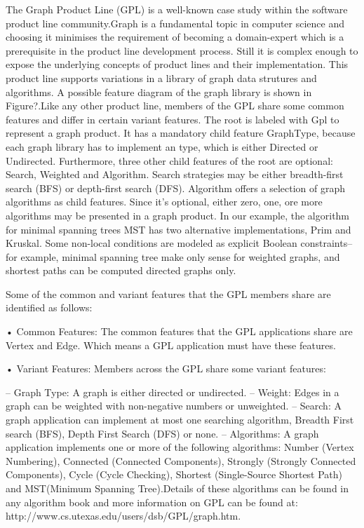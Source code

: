 

The Graph Product Line (GPL) is a well-known case study within the software product line community.Graph is a
fundamental topic in computer science and choosing it minimises the requirement
of becoming a domain-expert which is a prerequisite in the product line development process. Still it is complex
enough to expose the underlying concepts of product lines and their implementation. This product line
 supports variations in a library of graph data strutures and algorithms. A possible feature diagram of the graph
 library is shown in Figure?.Like any other product line, members of the GPL share some common features and differ in
 certain variant features. The root is labeled with Gpl to represent a graph product. It has a mandatory child feature
 GraphType, because each graph library has to implement an type, which is either Directed or Undirected. Furthermore,
 three other child features of the root are optional: Search, Weighted and Algorithm. Search strategies may be either
  breadth-first search (BFS) or depth-first search (DFS). Algorithm offers a selection of graph algorithms as child
  features. Since it's optional, either zero, one, ore more algorithms may be presented in a graph product. In our
  example, the algorithm for minimal spanning trees MST has two alternative implementations, Prim and Kruskal. Some
  non-local conditions are modeled as explicit Boolean constraints-- for example, minimal spanning tree make only
  sense for weighted graphs, and shortest paths can be computed directed graphs only.

  Some of the common and variant features that the GPL members share are identified as
  follows:

  • Common Features: The common features that the GPL applications share are Vertex and Edge.
  Which means a GPL application must have these features.

  • Variant Features: Members across the GPL share some variant features:

  – Graph Type: A graph is either directed or undirected.
  – Weight: Edges in a graph can be weighted with non-negative numbers or unweighted.
  – Search: A graph application can implement at most one searching algorithm, Breadth First
  search (BFS), Depth First Search (DFS) or none.
  – Algorithms: A graph application implements one or more of the following algorithms: Number
  (Vertex Numbering), Connected (Connected Components), Strongly (Strongly Connected
  Components), Cycle (Cycle Checking), Shortest (Single-Source Shortest Path) and MST(Minimum
  Spanning Tree).Details of these algorithms can be found in any algorithm book and more information
  on GPL can be found at: http://www.cs.utexas.edu/users/dsb/GPL/graph.htm.
